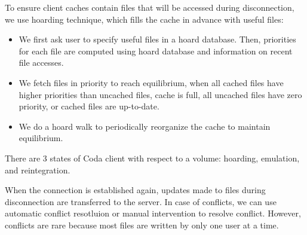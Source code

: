 \begin{multicols*}{2}
\noindent To ensure client caches contain files that will be accessed during disconnection, we use hoarding technique, which fills the cache in advance with useful files:
\begin{itemize}
    \item We first ask user to specify useful files in a hoard database. Then, priorities for each file are computed using hoard database and information on recent file accesses.
    \item We fetch files in priority to reach equilibrium, when all cached files have higher priorities than uncached files, cache is full, all uncached files have zero priority, or cached files are up-to-date. 
    \item We do a hoard walk to periodically reorganize the cache to maintain equilibrium. 
\end{itemize}

\noindent There are 3 states of Coda client with respect to a volume: hoarding, emulation, and reintegration. 

\begin{center}
\end{center}

\noindent When the connection is established again, updates made to files during disconnection are transferred to the server. In case of conflicts, we can use automatic conflict resotluion or manual intervention to resolve conflict. However, conflicts are rare because most files are written by only one user at a time. 

\end{multicols*}
